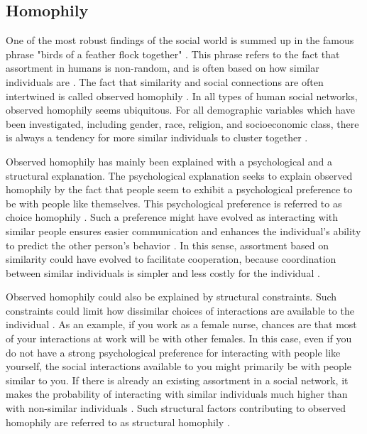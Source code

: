 \documentclass[11pt]{article}
\begin{document}
\subsection{Homophily}
One of the most robust findings of the social world is summed up in the famous phrase "birds of a feather flock together" \cite{mcpherson_birds_2001}. This phrase refers to the fact that assortment in humans is non-random, and is often based on how similar individuals are \cite{asikainen_cumulative_2020,crandall_feedback_2008,mcpherson_birds_2001}. The fact that similarity and social connections are often intertwined is called observed homophily \cite{mcpherson_birds_2001,kossinets_origins_2009}. In all types of human social networks, observed homophily seems ubiquitous.
For all demographic variables which have been investigated, including gender, race, religion, and socioeconomic class, there is always a tendency for more similar individuals to cluster together \cite{asikainen_cumulative_2020,mcpherson_birds_2001, taylor_exploring_2018}. 

\noindent Observed homophily has mainly been explained with a psychological and a structural explanation. The psychological explanation seeks to explain observed homophily by the fact that people seem to exhibit a psychological preference to be with people like themselves. This psychological preference is referred to as choice homophily \cite{asikainen_cumulative_2020,mcpherson_birds_2001,winter_you_2020}.
Such a preference might have evolved as interacting with similar people ensures easier communication and enhances the individual's ability to predict the other person's behavior \cite{kossinets_origins_2009,winter_you_2020}. In this sense, assortment based on similarity could have evolved to facilitate cooperation, because coordination between similar individuals is simpler and less costly for the individual \cite{winter_you_2020,carter2015phenotypic, smaldino2019social}. 

Observed homophily could also be explained by structural constraints. Such constraints could limit how dissimilar choices of interactions are available to the individual \cite{peixoto_disentangling_2022}. As an example, if you work as a female nurse, chances are that most of your interactions at work will be with other females. 
In this case, even if you do not have a strong psychological preference for interacting with people like yourself, the social interactions available to you might primarily be with people similar to you. 
If there is already an existing assortment in a social network, it makes the probability of interacting with similar individuals much higher than with non-similar individuals \cite{peixoto_disentangling_2022}. Such structural factors contributing to observed homophily are referred to as structural homophily \cite{asikainen_cumulative_2020,mcpherson_birds_2001,winter_you_2020}. 
\end{document}
